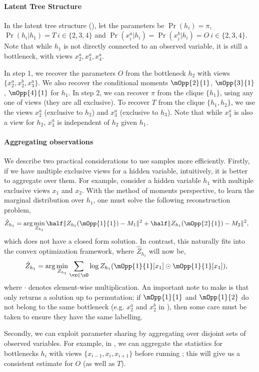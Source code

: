\paragraph{Latent Tree Structure}

In the latent tree structure (), let the
  parameters be $\Pr(h_i) = \pi$, $\Pr(h_i | h_1) = T ~i \in \{2,3,4\}$
  and $\Pr(x^a_i | h_i) = \Pr(x^b_i | h_i) = O ~i \in \{2,3,4\}$.
Note that while $h_1$ is not directly connected to an observed variable,
  it is still a bottleneck, with views $x^a_2, x^a_3, x^a_4$.

In step 1, we recover the parameters $O$ from the bottleneck $h_2$ with
  views $\{x^a_2, x^b_2, x^a_3\}$. We also recover the conditional moments
  $\mOpp{2}{1}$, $\mOpp{3}{1}$, $\mOpp{4}{1}$ for $h_1$. 
In step 2, we can recover $\pi$ from the clique $\{h_1\}$, using any
  one of views (they are all exclusive). 
To recover $T$ from the clique $\{h_1, h_2\}$, we use the views $x^a_2$
  (exclusive to $h_2$) and $x^a_3$ (exclusive to $h_3$). Note that while
  $x^a_3$ is also a view for $h_2$, $x^a_3$ is independent of $h_2$ given
  $h_1$.

\paragraph{Aggregating observations}
We describe two practical considerations to use samples more efficiently.
Firstly, if we have multiple exclusive views for a hidden variable,
  intuitively, it is better to aggregate over them. 
For example, consider a hidden variable $h_1$ with multiple exclusive
  views $x_1$ and $x_2$.
With the method of moments perspective, to learn the marginal
  distribution over $h_1$, one must solve the following reconstruction
  problem, 
\begin{align*}
  \hat Z_{h_1} &= \arg\min_{Z_{h_1}} \half \|Z_{h_1}(\mOpp{1}{1}) - M_1 \|^2 + \half \|Z_{h_1}(\mOpp{2}{1}) - M_2 \|^2,
\end{align*}
which does not have a closed form solution. 
In contrast, this naturally fits into the convex optimization framework, where $\hat Z_{h_1}$ will now be,
\begin{align*}
  \hat Z_{h_1} &= \arg\min_{Z_{h_1}} \sum_{\vx \in \sD} \log Z_{h_1}( \mOpp{1}{1}[x_1] \odot \mOpp{1}{1}[x_1] ),
\end{align*}
where $\cdot$ denotes element-wise multiplication.
An important note to make is that \TensorFactorize only returns
  a solution up to permutation; if $\mOpp{1}{1}$ and
  $\mOpp{1}{2}$ do not belong to the same bottleneck (e.g. $x^a_2$ and
  $x^b_2$ in ), then some
  care must be taken to ensure they have the same labelling.

Secondly, we can exploit parameter sharing by aggregating over
  disjoint sets of observed variables. 
For example, in , we can aggregate the statistics for
  bottlenecks $h_i$ with views $\{x_{i-1}, x_{i}, x_{i+1}\}$ before
  running \TensorFactorize; this will give us a consistent estimate for
  $O$ (as well as $T$).

